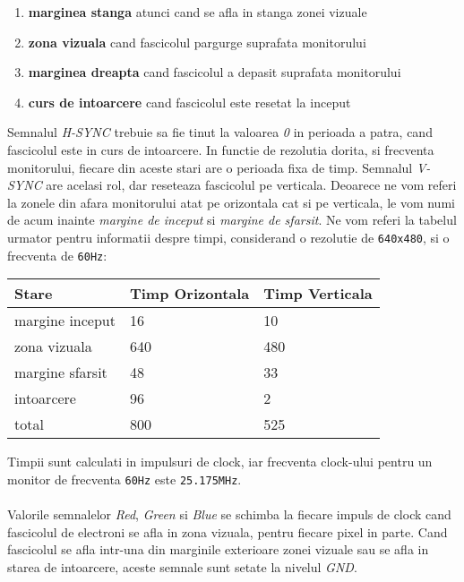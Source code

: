 \begin{enumerate}
\item{\bf marginea stanga} atunci cand se afla in stanga zonei vizuale
\item{\bf zona vizuala} cand fascicolul pargurge suprafata monitorului
\item{\bf marginea dreapta} cand fascicolul a depasit suprafata monitorului
\item{\bf curs de intoarcere} cand fascicolul este resetat la inceput
\end{enumerate}

Semnalul \emph{H-SYNC} trebuie sa fie tinut la valoarea \emph{0} in perioada a patra, cand fascicolul este in curs de intoarcere. In functie de rezolutia dorita, si frecventa monitorului, fiecare din aceste stari are o perioada fixa de timp. Semnalul \emph{V-SYNC} are acelasi rol, dar reseteaza fascicolul pe verticala. Deoarece ne vom referi la zonele din afara monitorului atat pe orizontala cat si pe verticala, le vom numi de acum inainte \emph{margine de inceput} si \emph{margine de sfarsit}. Ne vom referi la tabelul urmator pentru informatii despre timpi, considerand o rezolutie de {\tt 640x480}, si o frecventa de {\tt 60Hz}:

\begin{center}
    \begin{tabular}{| l | l | l |}
    \hline
    Stare & Timp Orizontala & Timp Verticala \\ \hline
	margine inceput & 16 & 10  \\ \hline
    zona vizuala & 640 & 480  \\ \hline
    margine sfarsit & 48 & 33 \\ \hline
    intoarcere & 96 & 2 \\ \hline
    total & 800 & 525 \\ 
    \hline
    \end{tabular}
\end{center}

Timpii sunt calculati in impulsuri de clock, iar frecventa clock-ului pentru un monitor de frecventa {\tt 60Hz} este {\tt 25.175MHz}.

\paragraph{}
Valorile semnalelor \emph{Red}, \emph{Green} si \emph{Blue} se schimba la fiecare impuls de clock cand fascicolul de electroni se afla in zona vizuala, pentru fiecare pixel in parte. Cand fascicolul se afla intr-una din marginile exterioare zonei vizuale sau se afla in starea de intoarcere, aceste semnale sunt setate la nivelul \emph{GND}.